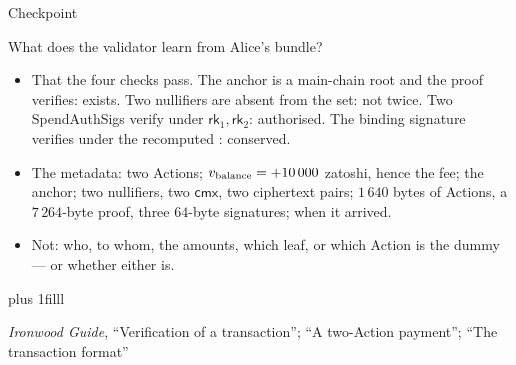 \documentclass[aspectratio=169,11pt]{beamer}
\newcommand{\nfsym}{\ensuremath{\mathsf{nf}}}
\newcommand{\cmx}{\ensuremath{\mathsf{cmx}}}
\newcommand{\cvsym}{\ensuremath{\mathsf{cv}}}
\newcommand{\rksym}{\ensuremath{\mathsf{rk}}}
\newcommand{\src}[1]{\par\vskip0pt plus 1filll
  {\fontsize{6}{7.2}\selectfont\color{arbdim}\raggedright #1\par}}
\begin{document}
\begin{frame}{Checkpoint}
\begin{center}\large
What does the validator learn from Alice's bundle?
\end{center}
\pause
\begin{itemize}
\item That the four checks pass. The anchor is a main-chain root and
  the proof verifies: exists. Two nullifiers are absent from the set:
  not twice. Two SpendAuthSigs verify under $\rksym_1, \rksym_2$:
  authorised. The binding signature verifies under the recomputed
  \Epbvk: conserved.
\item The metadata: two Actions; $v_{\mathrm{balance}} = +10\,000$ zatoshi, hence
  the fee; the anchor; two nullifiers, two \cmx, two ciphertext pairs;
  $1\,640$ bytes of Actions, a $7\,264$-byte proof, three $64$-byte
  signatures; when it arrived.
\item Not: who, to whom, the amounts, which leaf, or which Action is
  the dummy --- or whether either is.
\end{itemize}
\src{\emph{Ironwood Guide}, ``Verification of a transaction''; ``A two-Action
payment''; ``The transaction format''}
\end{frame}


\newcommand{\GZH}{\ensuremath{Z_H}}
\newcommand{\Glo}[1]{\ensuremath{#1_{\mathrm{lo}}}}
\newcommand{\Ghi}[1]{\ensuremath{#1_{\mathrm{hi}}}}
\newcommand{\GInstanceFig}{%
\begin{tikzpicture}[x=0.82cm,y=0.82cm,font=\scriptsize]
  \fill[arbdim!30] (0,0) rectangle ++(0.74,3.6);
  \node[anchor=south] at (0.37,3.65) {fixed};
  \foreach \i in {0,...,9}
    {\fill[arb!25] (1.0+\i*0.26,0) rectangle ++(0.22,3.6);}
  \node[anchor=south] at (2.3,3.65) {advice $\times 10$};
  \fill[arbdim!15] (3.75,0) rectangle ++(0.4,3.6);
  \node[anchor=south east] at (4.25,3.65) {table};
  \foreach \i in {0,...,9}
    {\draw[fill=arbred!25] (4.75,3.28-\i*0.31) rectangle ++(0.3,0.27);}
  \draw[arbred] (4.75,0) rectangle ++(0.3,0.15);
  \node[anchor=south west] at (4.7,3.65) {instance};
  \foreach \i/\l in {0/$\mathsf{anchor}$,1/$\cvsym.x$,2/$\cvsym.y$,
      3/$\nfsym$,4/$\rksym.x$,5/$\rksym.y$,6/$\cmx$,
      7/$\mathsf{enableSpends} = 1$,8/$\mathsf{enableOutputs} = 1$,
      9/{}}
    {\node[anchor=west] at (5.1,3.415-\i*0.31) {\l};}
  \node[anchor=west,text=arbdim] at (5.1,0.075) {$0$ below};
  \draw[-{Stealth}] (-0.2,3.6) -- (-0.2,0)
    node[midway,left=1pt,rotate=90,anchor=south] {$2^{11}$ rows};
\end{tikzpicture}}
\end{document}
